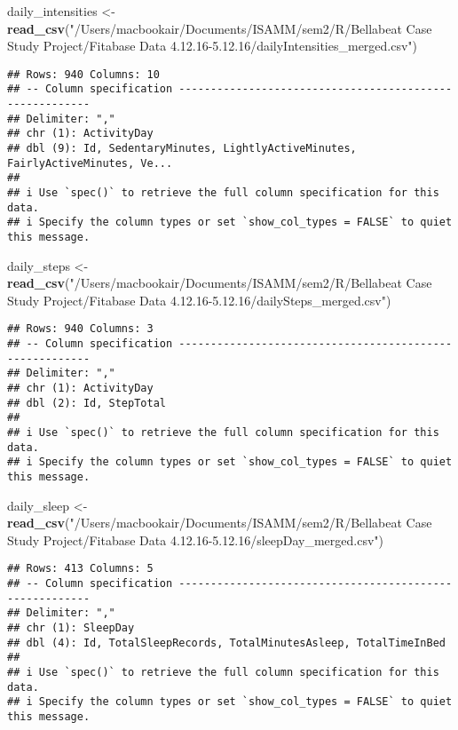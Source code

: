 \documentclass[
]{article}
\newenvironment{Shaded}{\begin{snugshade}}{\end{snugshade}}
\newcommand{\FunctionTok}[1]{\textcolor[rgb]{0.13,0.29,0.53}{\textbf{#1}}}
\newcommand{\NormalTok}[1]{#1}
\newcommand{\OtherTok}[1]{\textcolor[rgb]{0.56,0.35,0.01}{#1}}
\newcommand{\StringTok}[1]{\textcolor[rgb]{0.31,0.60,0.02}{#1}}
\begin{document}
\begin{Shaded}
\begin{Highlighting}[]
\NormalTok{daily\_intensities }\OtherTok{\textless{}{-}} \FunctionTok{read\_csv}\NormalTok{(}\StringTok{"/Users/macbookair/Documents/ISAMM/sem2/R/Bellabeat Case Study Project/Fitabase Data 4.12.16{-}5.12.16/dailyIntensities\_merged.csv"}\NormalTok{)}
\end{Highlighting}
\end{Shaded}

\begin{verbatim}
## Rows: 940 Columns: 10
## -- Column specification --------------------------------------------------------
## Delimiter: ","
## chr (1): ActivityDay
## dbl (9): Id, SedentaryMinutes, LightlyActiveMinutes, FairlyActiveMinutes, Ve...
## 
## i Use `spec()` to retrieve the full column specification for this data.
## i Specify the column types or set `show_col_types = FALSE` to quiet this message.
\end{verbatim}

\begin{Shaded}
\begin{Highlighting}[]
\NormalTok{daily\_steps }\OtherTok{\textless{}{-}} \FunctionTok{read\_csv}\NormalTok{(}\StringTok{"/Users/macbookair/Documents/ISAMM/sem2/R/Bellabeat Case Study Project/Fitabase Data 4.12.16{-}5.12.16/dailySteps\_merged.csv"}\NormalTok{)}
\end{Highlighting}
\end{Shaded}

\begin{verbatim}
## Rows: 940 Columns: 3
## -- Column specification --------------------------------------------------------
## Delimiter: ","
## chr (1): ActivityDay
## dbl (2): Id, StepTotal
## 
## i Use `spec()` to retrieve the full column specification for this data.
## i Specify the column types or set `show_col_types = FALSE` to quiet this message.
\end{verbatim}

\begin{Shaded}
\begin{Highlighting}[]
\NormalTok{daily\_sleep }\OtherTok{\textless{}{-}} \FunctionTok{read\_csv}\NormalTok{(}\StringTok{"/Users/macbookair/Documents/ISAMM/sem2/R/Bellabeat Case Study Project/Fitabase Data 4.12.16{-}5.12.16/sleepDay\_merged.csv"}\NormalTok{)}
\end{Highlighting}
\end{Shaded}

\begin{verbatim}
## Rows: 413 Columns: 5
## -- Column specification --------------------------------------------------------
## Delimiter: ","
## chr (1): SleepDay
## dbl (4): Id, TotalSleepRecords, TotalMinutesAsleep, TotalTimeInBed
## 
## i Use `spec()` to retrieve the full column specification for this data.
## i Specify the column types or set `show_col_types = FALSE` to quiet this message.
\end{verbatim}
\end{document}
